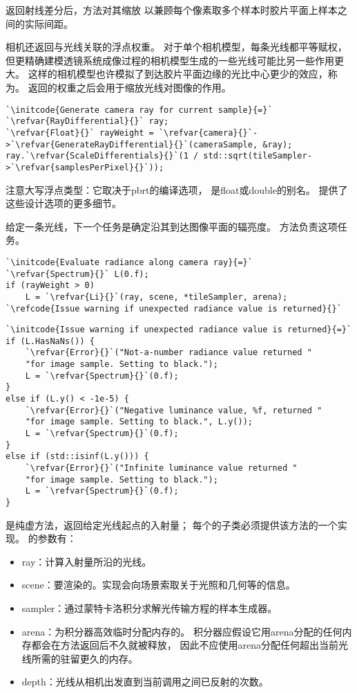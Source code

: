 返回射线差分后，方法对其缩放
以兼顾每个像素取多个样本时胶片平面上样本之间的实际间距。

相机还返回与光线关联的浮点权重。
对于单个相机模型，每条光线都平等赋权，
但更精确建模透镜系统成像过程的相机模型生成的一些光线可能比另一些作用更大。
这样的相机模型也许模拟了到达胶片平面边缘的光比中心更少的效应，称为。
返回的权重之后会用于缩放光线对图像的作用。
\begin{lstlisting}
`\initcode{Generate camera ray for current sample}{=}`
`\refvar{RayDifferential}{}` ray;
`\refvar{Float}{}` rayWeight = `\refvar{camera}{}`->`\refvar{GenerateRayDifferential}{}`(cameraSample, &ray);
ray.`\refvar{ScaleDifferentials}{}`(1 / std::sqrt(tileSampler->`\refvar{samplesPerPixel}{}`));
\end{lstlisting}

注意大写浮点类型：它取决于pbrt的编译选项，
是{\ttfamily float}或{\ttfamily double}的别名。
提供了这些设计选项的更多细节。

给定一条光线，下一个任务是确定沿其到达图像平面的辐亮度。
方法负责这项任务。
\begin{lstlisting}
`\initcode{Evaluate radiance along camera ray}{=}`
`\refvar{Spectrum}{}` L(0.f);
if (rayWeight > 0)
    L = `\refvar{Li}{}`(ray, scene, *tileSampler, arena);
`\refcode{Issue warning if unexpected radiance value is returned}{}`
\end{lstlisting}
\begin{lstlisting}
`\initcode{Issue warning if unexpected radiance value is returned}{=}`
if (L.HasNaNs()) {
    `\refvar{Error}{}`("Not-a-number radiance value returned "
    "for image sample. Setting to black.");
    L = `\refvar{Spectrum}{}`(0.f);
}
else if (L.y() < -1e-5) {
    `\refvar{Error}{}`("Negative luminance value, %f, returned "
    "for image sample. Setting to black.", L.y());
    L = `\refvar{Spectrum}{}`(0.f);
}
else if (std::isinf(L.y())) {
    `\refvar{Error}{}`("Infinite luminance value returned "
    "for image sample. Setting to black.");
    L = `\refvar{Spectrum}{}`(0.f);
}
\end{lstlisting}
是纯虚方法，返回给定光线起点的入射量；
每个的子类必须提供该方法的一个实现。
的参数有：
\begin{itemize}
    \item {\ttfamily ray}：计算入射量所沿的光线。
    \item {\ttfamily scene}：要渲染的。实现会向场景索取关于光照和几何等的信息。
    \item {\ttfamily sampler}：通过蒙特卡洛积分求解光传输方程的样本生成器。
    \item {\ttfamily arena}：为积分器高效临时分配内存的。
          积分器应假设它用{\ttfamily arena}分配的任何内存都会在方法返回后不久就被释放，
          因此不应使用{\ttfamily arena}分配任何超出当前光线所需的驻留更久的内存。
    \item {\ttfamily depth}：光线从相机出发直到当前调用之间已反射的次数。
\end{itemize}

